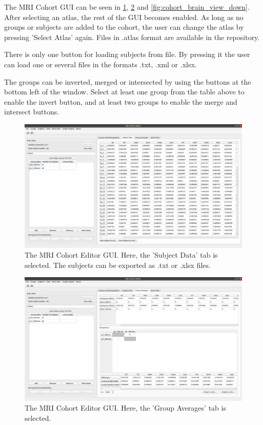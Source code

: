 \documentclass{article}
\begin{document}
The MRI Cohort GUI can be seen in \cref{fig:mri_cohort_subject}, \cref{fig:mri_cohort_group} and \cref{fig:cohort_brain_view_down}. After selecting an atlas, the rest of the GUI becomes enabled. As long as no groups or subjects are added to the cohort, the user can change the atlas by pressing 'Select Atlas' again. Files in .atlas format are available in the repository.

There is only one button for loading subjects from file. By pressing it the user can load one or several files in the formats .txt, .xml or .xlsx.

The groups can be inverted, merged or intersected by using the buttons at the bottom left of the window. Select at least one group from the table above to enable the invert button, and at least two groups to enable the merge and intersect buttons. 

\begin{figure}[H]
    \centering
    \includegraphics[width=0.9\linewidth]{mri_cohort_subject.png}
    \caption{The MRI Cohort Editor GUI. Here, the 'Subject Data' tab is selected. The subjects can be exported as .txt or .xlsx files.}
    \label{fig:mri_cohort_subject}
\end{figure}

\begin{figure}[H]
    \centering
    \includegraphics[width=0.9\linewidth]{mri_cohort_group.png}
    \caption{The MRI Cohort Editor GUI. Here, the 'Group Averages' tab is selected.}
    \label{fig:mri_cohort_group}
\end{figure}
\end{document}
